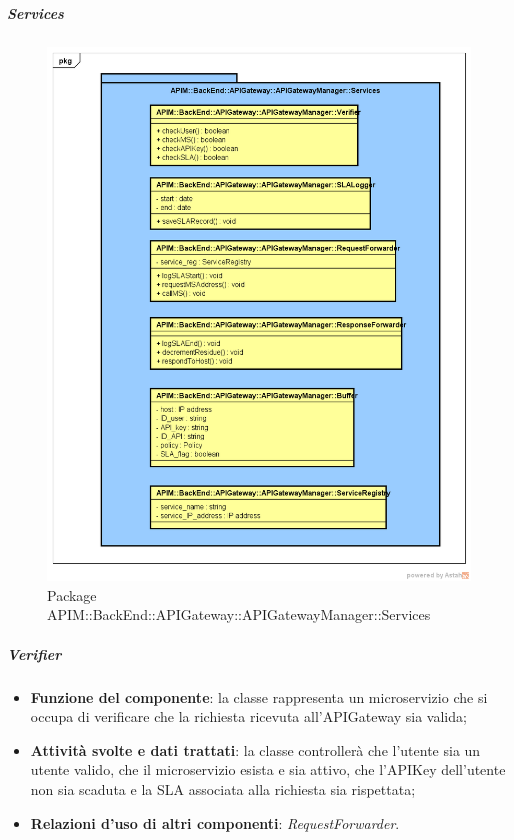 \subparagraph{Services}
\begin{figure}[!htbp]
	\centering
	\includegraphics[scale=0.45]{UML/DiagrammiPackage/APIGatewayManagerServices.png}
	\caption{Package APIM::BackEnd::APIGateway::APIGatewayManager::Services}
\end{figure}
\FloatBarrier

\subparagraph{Verifier}
\begin{itemize}
	\item \textbf{Funzione del componente}: la classe rappresenta un microservizio che si occupa di verificare che la richiesta ricevuta all'APIGateway sia valida;
	\item \textbf{Attivit\`{a} svolte e dati trattati}: la classe controller\`{a} che l'utente sia un utente valido, che il microservizio esista e sia attivo, che l'APIKey dell'utente non sia scaduta e la SLA associata alla richiesta sia rispettata;
	\item \textbf{Relazioni d'uso di altri componenti}: \textit{RequestForwarder}.

\end{itemize}

